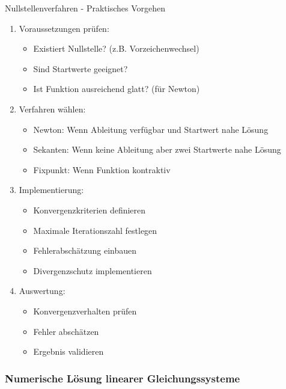 \begin{KR}{Nullstellenverfahren - Praktisches Vorgehen}
\begin{enumerate}
    \item Voraussetzungen prüfen:
    \begin{itemize}
        \item Existiert Nullstelle? (z.B. Vorzeichenwechsel)
        \item Sind Startwerte geeignet?
        \item Ist Funktion ausreichend glatt? (für Newton)
    \end{itemize}
    
    \item Verfahren wählen:
    \begin{itemize}
        \item Newton: Wenn Ableitung verfügbar und Startwert nahe Lösung
        \item Sekanten: Wenn keine Ableitung aber zwei Startwerte nahe Lösung
        \item Fixpunkt: Wenn Funktion kontraktiv
    \end{itemize}
    
    \item Implementierung:
    \begin{itemize}
        \item Konvergenzkriterien definieren
        \item Maximale Iterationszahl festlegen
        \item Fehlerabschätzung einbauen
        \item Divergenzschutz implementieren
    \end{itemize}
    
    \item Auswertung:
    \begin{itemize}
        \item Konvergenzverhalten prüfen
        \item Fehler abschätzen
        \item Ergebnis validieren
    \end{itemize}
\end{enumerate}
\end{KR}

\subsubsection{Numerische Lösung linearer Gleichungssysteme}

